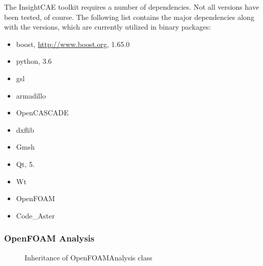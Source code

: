 The InsightCAE toolkit requires a number of dependencies. 
Not all versions have been tested, of course. 
The following list contains the major dependencies along with the versions, which are currently utilized in binary packages:
\begin{itemize}
\item boost, \url{http://www.boost.org}, 1.65.0
\item python, 3.6
\item gsl
\item armadillo
\item OpenCASCADE
\item dxflib
\item Gmsh
\item Qt, 5.
\item Wt
\item OpenFOAM
\item Code\_Aster
\end{itemize}



\subsubsection{OpenFOAM Analysis}


\begin{figure}[h!]
\centering
{}
\caption{Inheritance of OpenFOAMAnalysis class}
\label{fig:}
\end{figure}

